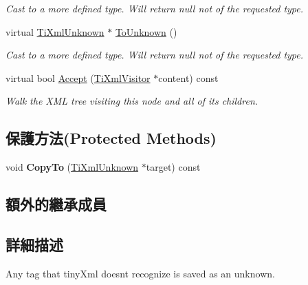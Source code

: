 \begin{DoxyCompactItemize}
\begin{DoxyCompactList}\small\item\em Cast to a more defined type. Will return null not of the requested type. \end{DoxyCompactList}\item 
virtual \hyperlink{class_ti_xml_unknown}{Ti\+Xml\+Unknown} $\ast$ \hyperlink{class_ti_xml_unknown_a67c9fd22940e8c47f706a72cdd2e332c}{To\+Unknown} ()\hypertarget{class_ti_xml_unknown_a67c9fd22940e8c47f706a72cdd2e332c}{}\label{class_ti_xml_unknown_a67c9fd22940e8c47f706a72cdd2e332c}

\begin{DoxyCompactList}\small\item\em Cast to a more defined type. Will return null not of the requested type. \end{DoxyCompactList}\item 
virtual bool \hyperlink{class_ti_xml_unknown_a4e54d7482e05a837cf83c925cc683380}{Accept} (\hyperlink{class_ti_xml_visitor}{Ti\+Xml\+Visitor} $\ast$content) const \hypertarget{class_ti_xml_unknown_a4e54d7482e05a837cf83c925cc683380}{}\label{class_ti_xml_unknown_a4e54d7482e05a837cf83c925cc683380}

\begin{DoxyCompactList}\small\item\em Walk the X\+ML tree visiting this node and all of its children. \end{DoxyCompactList}\end{DoxyCompactItemize}
\subsection*{保護方法(Protected Methods)}
\begin{DoxyCompactItemize}
\item 
void {\bfseries Copy\+To} (\hyperlink{class_ti_xml_unknown}{Ti\+Xml\+Unknown} $\ast$target) const \hypertarget{class_ti_xml_unknown_a08ca7b225a2bcb604d3c72e199d33408}{}\label{class_ti_xml_unknown_a08ca7b225a2bcb604d3c72e199d33408}

\end{DoxyCompactItemize}
\subsection*{額外的繼承成員}


\subsection{詳細描述}
Any tag that tiny\+Xml doesn\textquotesingle{}t recognize is saved as an unknown. 

